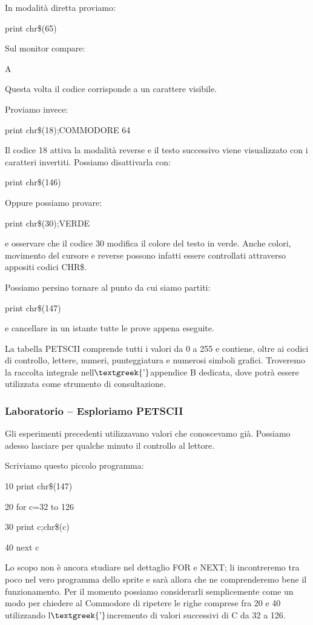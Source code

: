 \documentclass{article}
\begin{document}
In modalità diretta proviamo:

print chr\$(65)

Sul monitor compare:

A

Questa volta il codice corrisponde a un carattere visibile.

Proviamo invece:

print chr\$(18);{\textquotedbl}COMMODORE 64{\textquotedbl}

Il codice 18 attiva la modalità reverse e il testo successivo viene visualizzato con i caratteri invertiti. Possiamo
disattivarla con:

print chr\$(146)

Oppure possiamo provare:

print chr\$(30);{\textquotedbl}VERDE{\textquotedbl}

e osservare che il codice 30 modifica il colore del testo in verde. Anche colori, movimento del cursore e reverse
possono infatti essere controllati attraverso appositi codici CHR\$. 

Possiamo persino tornare al punto da cui siamo partiti:

print chr\$(147)

e cancellare in un istante tutte le prove appena eseguite.

La tabella PETSCII comprende tutti i valori da 0 a 255 e contiene, oltre ai codici di controllo, lettere, numeri,
punteggiatura e numerosi simboli grafici. Troveremo la raccolta integrale nell$\text{\textgreek{’}}$appendice B
dedicata, dove potrà essere utilizzata come strumento di consultazione.

\subsubsection{Laboratorio – Esploriamo PETSCII}
Gli esperimenti precedenti utilizzavano valori che conoscevamo già. Possiamo adesso lasciare per qualche minuto il
controllo al lettore.

Scriviamo questo piccolo programma:

10 print chr\$(147)

20 for c=32 to 126

30 print c;chr\$(c)

40 next c

Lo scopo non è ancora studiare nel dettaglio FOR e NEXT; li incontreremo tra poco nel vero programma dello sprite e sarà
allora che ne comprenderemo bene il funzionamento. Per il momento possiamo considerarli semplicemente come un modo per
chiedere al Commodore di ripetere le righe comprese fra 20 e 40 utilizzando l$\text{\textgreek{’}}$incremento di valori
successivi di C da 32 a 126.
\end{document}
